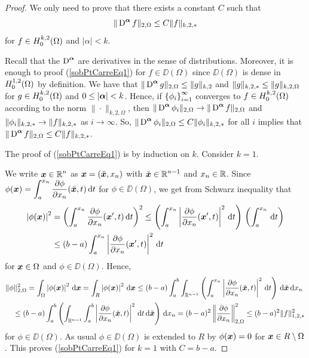 \begin{proof}
We only need to prove that there exists a constant $C$ such that
\begin{equation} \label{sobPtCarreEq1}
  \| \operatorname{D}^{{\bm{\alpha}}} f \|_{2,\Omega} \leq C \|f\|_{k,2,\ast}
\end{equation}
for $\displaystyle f \in H^{k,2}_0(\Omega)$ and $|\alpha|<k$.

Recall that the $\displaystyle \operatorname{D}^{{\bm{\alpha}}}$ are derivatives
in the sense of distributions.  Moreover, it is enough to proof
(\ref{sobPtCarreEq1}) for $f \in \DD(\Omega)$ since $\DD(\Omega)$ is dense in
$\displaystyle H^{1,2}_0(\Omega)$
by definition.  We have that
$\displaystyle \| \operatorname{D}^{{\bm{\alpha}}} g \|_{2,\Omega} \leq \|g\|_{k,2}$
and $\displaystyle \|g\|_{k,2,\ast} \leq \|g\|_{k,2,\Omega}$ for
$\displaystyle g \in H^{k,2}_0(\Omega)$ and $0\leq |{\bm{\alpha}}|<k$.  Hence, if
$\displaystyle \left\{\phi_i\right\}_{i=1}^\infty$ converges to 
$\displaystyle f \in H^{k,2}_0(\Omega)$ according to the norm
$\|\cdot\|_{k,2,\Omega}$, then
$\displaystyle \| \operatorname{D}^{{\bm{\alpha}}} \phi_i \|_{2,\Omega}
\rightarrow \| \operatorname{D}^{{\bm{\alpha}}} f \|_{2,\Omega}$
and $\displaystyle \|\phi_i\|_{k,2,\ast} \rightarrow \|f\|_{k,2,\ast}$
as $i\rightarrow \infty$.  So,
$\displaystyle \| \operatorname{D}^{{\bm{\alpha}}} \phi_i \|_{2,\Omega}
\leq C \|\phi_i\|_{k,2,\ast}$ for
all $i$ implies that
$\displaystyle \| \operatorname{D}^{{\bm{\alpha}}} f \|_{2,\Omega} \leq C \|f\|_{k,2,\ast}$.

The proof of (\ref{sobPtCarreEq1}) is by induction on $k$.  Consider $k=1$.

We write $\displaystyle {\bm{x}}\in \mathbb{R}^n$ as
${\bm{x}} = (\breve{{\bm{x}}}, x_n)$ with
$\displaystyle \breve{{\bm{x}}} \in \mathbb{R}^{n-1}$ and $x_n \in \mathbb{R}$.
Since \\
$\displaystyle \phi({\bm{x}})
= \int_a^{x_n} \frac{\partial{\phi}}{\partial x_n}(\breve{{\bm{x}}}, t) \,\mathrm{d}{t}$
for $\phi \in \DD(\Omega)$, we get from Schwarz inequality that
\begin{align*}
\left|\phi({\bm{x}})\right|^2 &= \left( \int_a^{x_n}
\frac{\partial{\phi}}{\partial x_n} ({\bm{x}}',t) \,\mathrm{d}{t} \right)^2 
\leq \left(\int_a^{x_n}
\left| \frac{\partial{\phi}}{\partial x_n} ({\bm{x}}',t)\right|^2 \,\mathrm{d}{t}\right)\,
\left( \int_a^{x_n} \,\mathrm{d}{t}\right) \\
&\leq (b-a) \int_a^{x_n} \left| \frac{\partial{\phi}}{\partial x_n} ({\bm{x}}',t)\right|^2 \,\mathrm{d}{t}
\end{align*}
for ${\bm{x}} \in \Omega$ and $\phi \in \DD(\Omega)$.  Hence,
\begin{align*}
& \|\phi\|_{2,\Omega}^2 = \int_\Omega \left|\phi({\bm{x}})\right|^2\,\mathrm{d}{{\bm{x}}} 
= \int_R \left|\phi({\bm{x}})\right|^2\,\mathrm{d}{{\bm{x}}}
\leq (b-a) \int_a^b \int_{\mathbb{R}^{n-1}} \left(
\int_a^{x_n} \left| \frac{\partial{\phi}}{\partial x_n} (\breve{{\bm{x}}},t)\right|^2 \,\mathrm{d}{t}\right)
\,\mathrm{d}{\breve{{\bm{x}}}} \,\mathrm{d}{x_n} \\
&\quad \leq (b-a) \int_a^b \left( \int_{\mathbb{R}^{n-1}}
\int_a^b \left| \frac{\partial{\phi}}{\partial x_n} (\breve{{\bm{x}}},t)\right|^2 \,\mathrm{d}{t}
\,\mathrm{d}{\breve{{\bm{x}}}} \right) \,\mathrm{d}{x_n}
= (b-a)^2 \left\| \frac{\partial{\phi}}{\partial x_n} \right\|_{2,\Omega}^2 \leq (b-a)^2
\| f \|_{1,2,\ast}^2
\end{align*}
for $\phi \in \DD(\Omega)$.  As usual $\phi \in \DD(\Omega)$ is
extended to $R$ by $\phi({\bm{x}}) = 0$ for ${\bm{x}} \in R \setminus \Omega$.
This proves (\ref{sobPtCarreEq1}) for $k=1$ with $C=b-a$.


\end{proof}

